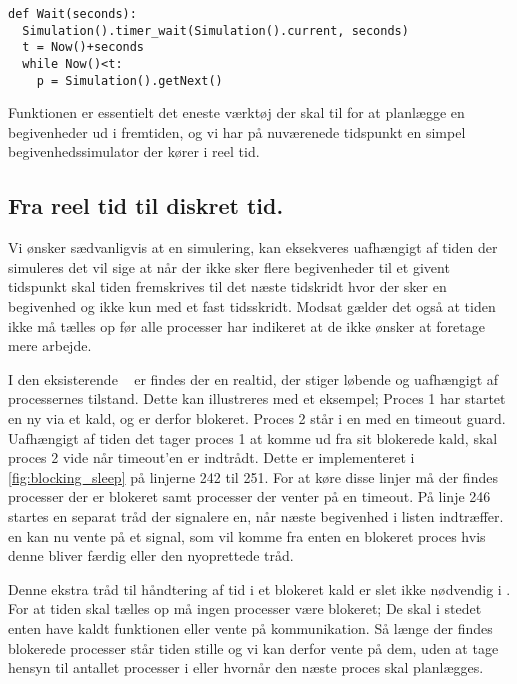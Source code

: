 \begin{lstlisting}[firstnumber=20,float=hbtp, label=wait, caption=Wait i simuleringsversionen.] 
def Wait(seconds): 
  Simulation().timer_wait(Simulation().current, seconds) 
  t = Now()+seconds
  while Now()<t: 
    p = Simulation().getNext() 
\end{lstlisting}

Funktionen  er essentielt det eneste værktøj der skal til for at planlægge en begivenheder ud i fremtiden, og vi har på nuværenede tidspunkt en  simpel begivenhedssimulator der kører i reel tid. 

\subsection{Fra reel tid til diskret tid.}\label{sec:}
Vi ønsker sædvanligvis at en simulering, kan eksekveres uafhængigt af tiden der simuleres det vil sige at når der ikke sker flere begivenheder til et givent tidspunkt skal tiden fremskrives til det næste tidskridt hvor der sker en begivenhed og ikke kun med et fast tidsskridt. Modsat gælder det også at tiden ikke må tælles op før alle processer har indikeret at de ikke ønsker at foretage mere arbejde. \vo

I den eksisterende \sched ~ er findes der en realtid, der stiger løbende og uafhængigt af processernes tilstand. Dette kan illustreres med et eksempel; Proces 1 har startet en ny  via et  kald, og er derfor blokeret. Proces 2 står i en  med en timeout guard. Uafhængigt af tiden det tager proces 1 at komme ud fra sit blokerede kald, skal proces 2 vide når timeout'en er indtrådt. Dette er implementeret i \cref{fig:blocking_sleep} på linjerne 242 til 251. For at køre disse linjer må der findes processer der er blokeret samt processer der venter på en timeout. På linje 246 startes en separat tråd der signalere \sched en, når næste begivenhed i  listen indtræffer. \Sched en kan nu vente på et signal, som vil komme fra enten en blokeret proces hvis denne bliver færdig eller den nyoprettede tråd.

Denne ekstra tråd til håndtering af tid i et blokeret kald er slet ikke nødvendig i \des. For at tiden skal tælles op må ingen processer være blokeret; De skal i stedet enten have kaldt funktionen  eller vente på kommunikation.  
Så længe der findes blokerede processer står tiden stille og vi kan derfor vente på dem, uden at tage hensyn til antallet processer i  eller hvornår den næste proces skal planlægges.

